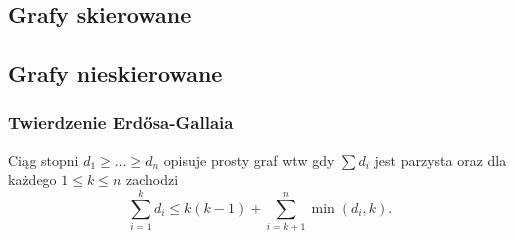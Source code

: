 \subsection{Grafy skierowane}

\subsection{Grafy nieskierowane}
\subsubsection{Twierdzenie Erd\H{o}sa-Gallaia}
Ciąg stopni $d_1 \geq \dots \geq d_n$ opisuje prosty graf wtw gdy
$\sum d_i$ jest parzysta oraz dla każdego $1 \leq k \leq n$ zachodzi
\[
  \sum_{i=1}^{k} d_i \leq k(k - 1) + \sum_{i=k + 1}^{n} \min(d_i, k).
\]

